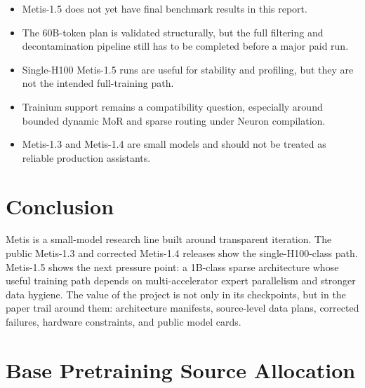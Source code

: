 \documentclass[11pt]{article}
\begin{document}
\begin{itemize}
  \item Metis-1.5 does not yet have final benchmark results in this report.
  \item The 60B-token plan is validated structurally, but the full filtering and
  decontamination pipeline still has to be completed before a major paid run.
  \item Single-H100 Metis-1.5 runs are useful for stability and profiling, but
  they are not the intended full-training path.
  \item Trainium support remains a compatibility question, especially around
  bounded dynamic MoR and sparse routing under Neuron compilation.
  \item Metis-1.3 and Metis-1.4 are small models and should not be treated as
  reliable production assistants.
\end{itemize}

\section{Conclusion}

Metis is a small-model research line built around transparent iteration. The
public Metis-1.3 and corrected Metis-1.4 releases show the single-H100-class
path. Metis-1.5 shows the next pressure point: a 1B-class sparse architecture
whose useful training path depends on multi-accelerator expert parallelism and
stronger data hygiene. The value of the project is not only in its checkpoints,
but in the paper trail around them: architecture manifests, source-level data
plans, corrected failures, hardware constraints, and public model cards.

\appendix

\section{Base Pretraining Source Allocation}
\label{app:pretrain_sources}
\end{document}
